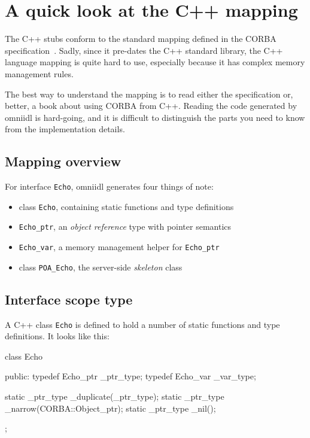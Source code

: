 \documentclass[11pt,oneside,a4paper]{book}
\newcommand{\type}[1]{\texttt{#1}}
\begin{document}
\section{A quick look at the C++ mapping}

The C++ stubs conform to the standard mapping defined in the CORBA
specification~\cite{cxxmapping}. Sadly, since it pre-dates the C++
standard library, the C++ language mapping is quite hard to use,
especially because it has complex memory management rules.

The best way to understand the mapping is to read either the
specification or, better, a book about using CORBA from C++. Reading
the code generated by omniidl is hard-going, and it is difficult to
distinguish the parts you need to know from the implementation
details.


\subsection{Mapping overview}

For interface \type{Echo}, omniidl generates four things of note:

\begin{itemize}
\item class \type{Echo}, containing static functions and type
  definitions

\item \type{Echo\_ptr}, an \emph{object reference} type with pointer
  semantics

\item \type{Echo\_var}, a memory management helper for
  \type{Echo\_ptr}

\item class \type{POA\_Echo}, the server-side \emph{skeleton} class

\end{itemize}


\subsection{Interface scope type}

A C++ class \type{Echo} is defined to hold a number of static
functions and type definitions. It looks like this:

\begin{cxxlisting}
class Echo {
public:
  typedef Echo_ptr _ptr_type;
  typedef Echo_var _var_type;

  static _ptr_type _duplicate(_ptr_type);
  static _ptr_type _narrow(CORBA::Object_ptr);
  static _ptr_type _nil();
};
\end{cxxlisting}
\end{document}
